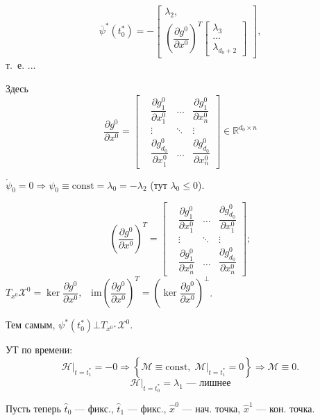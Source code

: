\documentclass[12pt, a4paper]{article}
\theoremstyle{rusdef}
\newcommand{\R}{\ensuremath{\mathbb{R}}} %
\newcommand{\X}{\mathscr{X}} %
\renewcommand{\H}{\mathcal{H}} %
\newcommand{\M}{\mathcal{M}} %
\renewcommand{\d}{\partial} %
\DeclareMathOperator*{\thus}{\Rightarrow} %
\begin{document}
$$
\bar{\psi}^*(t_0^*) = - \left[ \begin{matrix}
\lambda_2,\\ \left( \dfrac{\d g^0}{\d x^0} \right)^T \left[ \begin{matrix}
\lambda_{3} \\ \ldots \\ \lambda_{d_0 + 2}
\end{matrix} \right]
\end{matrix} \right],
$$
т.~е. ...

Здесь 
$$
\dfrac{\d g^0}{\d x^0} = \left[ \begin{matrix}
&\dfrac{\d g_1^0}{\d x_1^0} &\ldots &\dfrac{\d g_1^0}{\d x_n^0}\\
&\vdots &\ddots &\vdots\\
&\dfrac{\d g^0_{d_0}}{\d x_1^0} &\ldots &\dfrac{\d g^0_{d_0}}{\d x_n^0}
\end{matrix} \right] \in \R^{d_0 \times n}
$$

$\dot{\psi}_0 = 0 \thus \psi_0 \equiv \mathrm{const} = \lambda_0 = -\lambda_2$ (тут $\lambda_0 \leqslant 0$).

$$
\left(\dfrac{\d g^0}{\d x^0}\right)^T = \left[ \begin{matrix}
&\dfrac{\d g_1^0}{\d x_1^0} &\ldots &\dfrac{\d g^0_{d_0}}{\d x_1^0}\\
&\vdots &\ddots &\vdots\\
&\dfrac{\d g_1^0}{\d x_n^0} &\ldots &\dfrac{\d g^0_{d_0}}{\d x_n^0}
\end{matrix} \right];
$$
$T_{x^0} \X^0 = \ker \dfrac{\d g^0}{\d x^0}, \;\;\; \mathrm{im} \left(\dfrac{\d g^0}{\d x^0}\right)^T = \left( \ker \dfrac{\d g^0}{\d x^0} \right)^{\bot}$.

Тем самым, $\psi^*(t_0^*) \bot T_{x^{0*}} \X^0$.

УТ по времени:
$$
\left. \H \right|_{t = t_1^*} = -0 \thus \left\{ \M \equiv \mathrm{const}, \; \left. \M \right|_{t = t_1^*} = 0 \right\} \thus \M \equiv 0.
$$
$$
\left. \H \right|_{t = t_0^*} = \lambda_1 \text{ --- лишнее}
$$

Пусть теперь $\hat{t}_0$ --- фикс., $\hat{t}_1$ --- фикс., $\hat{x}^0$ --- нач. точка, $\hat{x}^1$ --- кон. точка.
\end{document}
